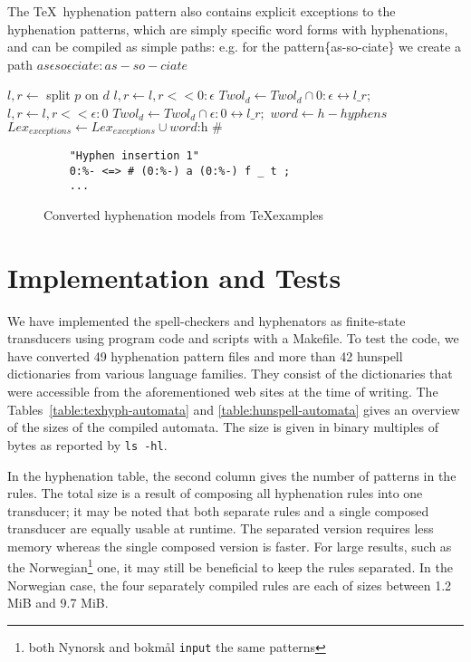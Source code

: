 \documentclass[a4paper,conference]{IEEEtran}
\begin{document}
The \TeX\ hyphenation pattern also contains explicit exceptions to the
hyphenation patterns, which are simply specific word forms with hyphenations,
and can be compiled as simple paths: e.g. for the pattern\{as-so-ciate\} we
create a path $as\epsilon so\epsilon ciate:as-so-ciate$

\begin{algorithm}[tbp]
  \caption{Extracting hyphenation patterns from \TeX}
  \label{algo:texpat}
  \begin{algorithmic}[2]
    \STATE $l, r \leftarrow$ split $p$ on $d$
    \STATE $l, r \leftarrow l, r << 0:\epsilon$
    \STATE $Twol_d \leftarrow Twol_d \cap 0:\epsilon \leftrightarrow l \_ r ;$
    \ELSE
    \STATE $l, r \leftarrow l, r << \epsilon:0$
    \STATE $Twol_d \leftarrow Twol_d \cap \epsilon:0 \leftrightarrow l \_ r ;$
    \ENDIF
    \ENDFOR
    \ENDFOR
    \STATE $word \leftarrow h - hyphens$
    \STATE $Lex_{exceptions} \leftarrow Lex_{exceptions} \cup \textit{word:h \#}$
    \ENDFOR
  \end{algorithmic}
\end{algorithm}

\begin{figure}[tbp]
  \centering
  \begin{lstlisting}
    "Hyphen insertion 1"
    0:%- <=> # (0:%-) a (0:%-) f _ t ;
    ...
  \end{lstlisting}
  \caption{Converted hyphenation models from \TeX examples}
  \label{fig:twolc-hyphen-models}
\end{figure}

\section{Implementation and Tests}

We have implemented the spell-checkers and hyphenators as finite-state
transducers using program code and scripts with a Makefile.  To test the code, we have
converted 49 hyphenation pattern files and more than 42 hunspell
dictionaries from various language families. They consist of the dictionaries that were accessible from the
aforementioned web sites at the time of writing. The
Tables~\ref{table:texhyph-automata} and \ref{table:hunspell-automata}
gives an overview of the sizes of the compiled automata. The size is given in binary multiples
of bytes as reported by \texttt{ls -hl}. 

In the hyphenation table, the second
column gives the number of patterns in the rules. The total size is a result of
composing all hyphenation rules into one transducer; it may be noted that
both separate rules and a single composed transducer are equally usable at runtime. The separated
version requires less memory whereas the single composed version is faster.  For large results, such as the
Norwegian\footnote{both Nynorsk and bokmål \texttt{input} the same patterns}
one, it may still be beneficial to keep the rules separated. In the Norwegian
case, the four separately compiled rules are each of sizes between 1.2 MiB and 9.7 MiB.
\end{document}
